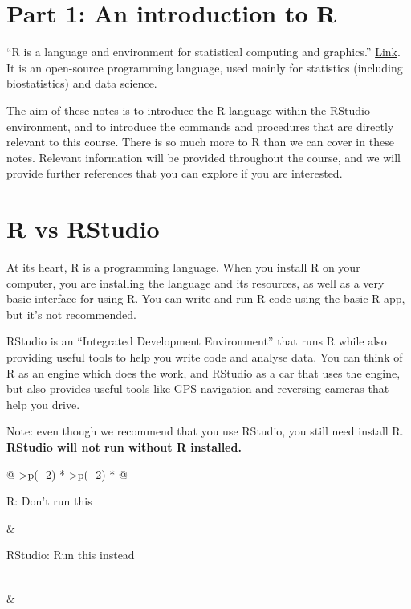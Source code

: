 \documentclass[
]{memoir}
\begin{document}
\hypertarget{part-1-an-introduction-to-r}{%
\section*{Part 1: An introduction to R}\label{part-1-an-introduction-to-r}}

``R is a language and environment for statistical computing and graphics.'' \href{https://www.r-project.org/about.html}{Link}. It is an open-source programming language, used mainly for statistics (including biostatistics) and data science.

The aim of these notes is to introduce the R language within the RStudio environment, and to introduce the commands and procedures that are directly relevant to this course. There is so much more to R than we can cover in these notes. Relevant information will be provided throughout the course, and we will provide further references that you can explore if you are interested.

\hypertarget{r-vs-rstudio}{%
\section{R vs RStudio}\label{r-vs-rstudio}}

At its heart, R is a programming language. When you install R on your computer, you are installing the language and its resources, as well as a very basic interface for using R. You can write and run R code using the basic R app, but it's not recommended.

RStudio is an ``Integrated Development Environment'' that runs R while also providing useful tools to help you write code and analyse data. You can think of R as an engine which does the work, and RStudio as a car that uses the engine, but also provides useful tools like GPS navigation and reversing cameras that help you drive.

Note: even though we recommend that you use RStudio, you still need install R. \textbf{RStudio will not run without R installed.}

\begin{longtable}[]{@{}
  >{\centering\arraybackslash}p{(\columnwidth - 2\tabcolsep) * }
  >{\centering\arraybackslash}p{(\columnwidth - 2\tabcolsep) * }@{}}
\toprule
\begin{minipage}[b]{\linewidth}\centering
R: Don't run this
\end{minipage} & \begin{minipage}[b]{\linewidth}\centering
RStudio: Run this instead
\end{minipage} \\
\midrule
\endhead
& \\
\bottomrule
\end{longtable}
\end{document}
